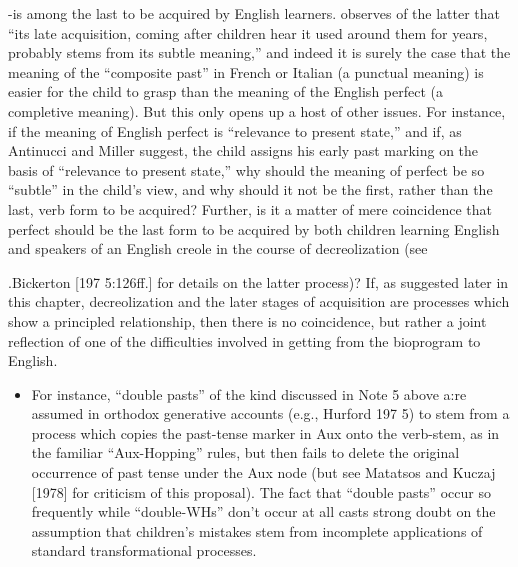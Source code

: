 \begin{itemize}
\begin{itemize}
\begin{itemize}
\begin{itemize}
\begin{itemize}
\begin{itemize}
\begin{itemize}
\begin{itemize}
\begin{itemize}
\begin{itemize}
{}-is among the last to be acquired by English learners. \citet{Maratsos1979} observes of the latter that ``its late acquisition, coming after children hear it used around them for years, probably stems from its subtle meaning,'' and indeed it is surely the case that the meaning of the ``composite past'' in French or Italian (a punctual meaning) is easier for the child to grasp than the meaning of the English perfect (a com\-pletive meaning). But this only opens up a host of other issues. For instance, if the meaning of English perfect is ``relevance to present state,'' and if, as Antinucci and Miller suggest, the child assigns his early past marking on the basis of ``relevance to present state,'' why should the meaning of perfect be so ``subtle'' in the child's view, and why should it not be the first, rather than the last, verb form to be acquired? Further, is it a matter of mere coincidence that perfect should be the last form to be acquired by both children learning English and speakers of an English creole in the course of decreolization (see

.Bickerton [197 5:126ff.] for details on the latter process)? If, as suggested later in this chapter, decreolization and the later stages of acquisition are processes which show a principled relationship, then there is no coincidence, but rather a joint reflection of one of the difficulties involved in getting from the bioprogram to English.

\begin{itemize}
\item For instance, ``double pasts'' of the kind discussed in Note 5 above a:re assumed in orthodox generative accounts (e.g., Hurford 197 5) to stem from a process which copies the past-tense marker in Aux onto the verb-stem, as in the familiar ``Aux-Hopping'' rules, but then fails to delete the original occurrence of past tense under the Aux node (but see Matatsos and Kuczaj [1978] for criticism of this proposal). The fact that ``double pasts'' occur so frequently while ``double-WHs'' don't occur at all casts strong doubt on the assumption that children's mistakes stem from incomplete applications of standard transformational processes.
\end{itemize}



\end{itemize}
\end{itemize}
\end{itemize}
\end{itemize}
\end{itemize}
\end{itemize}
\end{itemize}
\end{itemize}
\end{itemize}
\end{itemize}
